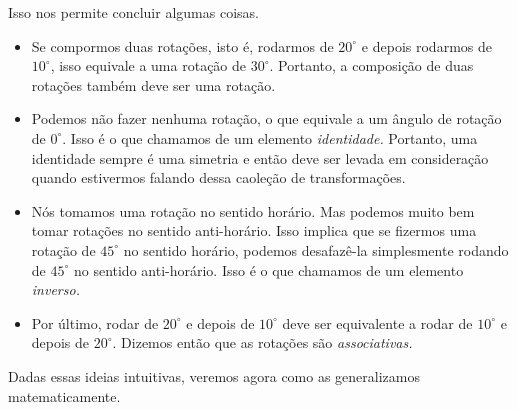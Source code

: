 \documentclass{article}
\numberwithin{equation}{section}
\numberwithin{figure}{section}
\begin{document}
Isso nos permite concluir algumas coisas. 
\begin{itemize}
	\item Se compormos duas rotações, isto é, rodarmos de $20^{\circ}$ e depois rodarmos de $10^{\circ}$, isso equivale a uma rotação de $30^{\circ}$. Portanto, a composição de duas rotações também deve ser uma rotação. 
	\item Podemos não fazer nenhuma rotação, o que equivale a um ângulo de rotação de $0^{\circ}$. Isso é o que chamamos de um elemento \textit{identidade.} Portanto, uma identidade sempre é uma simetria e então deve ser levada em consideração quando estivermos falando dessa caoleção de transformações. 
	\item Nós tomamos uma rotação no sentido horário. Mas podemos muito bem tomar rotações no sentido anti-horário. Isso implica que se fizermos uma rotação de $45^{\circ}$ no sentido horário, podemos desafazê-la simplesmente rodando de $45^{\circ}$ no sentido anti-horário. Isso é o que chamamos de um elemento \textit{inverso.}
	\item Por último, rodar de $20^{\circ}$ e depois de $10^{\circ}$ deve ser equivalente a rodar de $10^{\circ}$ e depois de $20^{\circ}$. Dizemos então que as rotações são \textit{associativas.}
\end{itemize}
Dadas essas ideias intuitivas, veremos agora como as generalizamos matematicamente.  
\end{document}

